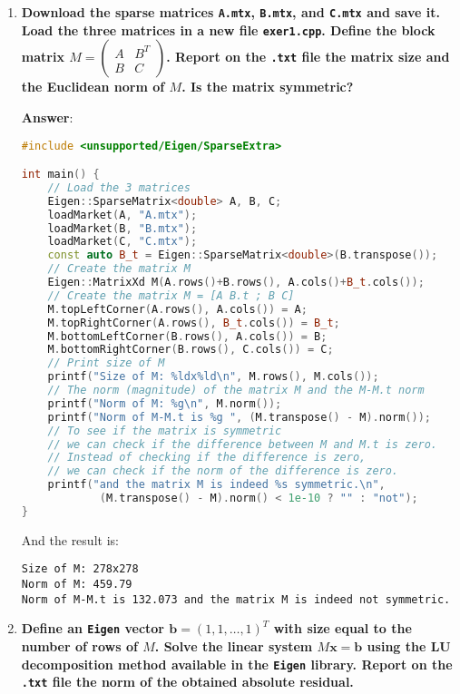 \begin{enumerate}[label=\textcolor{Green3}{\textbf{\arabic*.}}]
    \item \textcolor{Green3}{\textbf{%
        Download the sparse matrices \texttt{A.mtx}, \texttt{B.mtx}, and \texttt{C.mtx} and save it. Load the three matrices in a new file \texttt{exer1.cpp}. Define the block matrix $M = \begin{pmatrix}
            A & B^{T} \\ B & C
        \end{pmatrix}$. Report on the \texttt{.txt} file the matrix size and the Euclidean norm of $M$. Is the matrix symmetric?
    }}

    \textbf{Answer}:
    \begin{lstlisting}[language=C++]
#include <unsupported/Eigen/SparseExtra>

int main() {
    // Load the 3 matrices
    Eigen::SparseMatrix<double> A, B, C;
    loadMarket(A, "A.mtx");
    loadMarket(B, "B.mtx");
    loadMarket(C, "C.mtx");
    const auto B_t = Eigen::SparseMatrix<double>(B.transpose());
    // Create the matrix M
    Eigen::MatrixXd M(A.rows()+B.rows(), A.cols()+B_t.cols());
    // Create the matrix M = [A B.t ; B C]
    M.topLeftCorner(A.rows(), A.cols()) = A;
    M.topRightCorner(A.rows(), B_t.cols()) = B_t;
    M.bottomLeftCorner(B.rows(), A.cols()) = B;
    M.bottomRightCorner(B.rows(), C.cols()) = C;
    // Print size of M
    printf("Size of M: %ldx%ld\n", M.rows(), M.cols());
    // The norm (magnitude) of the matrix M and the M-M.t norm
    printf("Norm of M: %g\n", M.norm());
    printf("Norm of M-M.t is %g ", (M.transpose() - M).norm());
    // To see if the matrix is symmetric
    // we can check if the difference between M and M.t is zero.
    // Instead of checking if the difference is zero,
    // we can check if the norm of the difference is zero.
    printf("and the matrix M is indeed %s symmetric.\n",
            (M.transpose() - M).norm() < 1e-10 ? "" : "not");
}\end{lstlisting}
    And the result is:
    \begin{lstlisting}
Size of M: 278x278
Norm of M: 459.79
Norm of M-M.t is 132.073 and the matrix M is indeed not symmetric.\end{lstlisting}




    \item \textcolor{Green3}{\textbf{%
        Define an \texttt{Eigen} vector $\mathbf{b} = \left(1, 1, \dots, 1\right)^{T}$ with size equal to the number of rows of $M$. Solve the linear system $M\mathbf{x} = \mathbf{b}$ using the LU decomposition method available in the \texttt{Eigen} library. Report on the \texttt{.txt} file the norm of the obtained absolute residual.
    }}


\end{enumerate}
